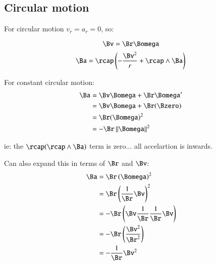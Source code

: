 \documentclass{article}
\newcommand{\Norm}[1]{\left\lVert{#1}\right\rVert}
\begin{document}
\subsection{Circular motion}

For circular motion $v_r = a_r = 0$, so:

\[
\Bv = \Br \Bomega
\]
\[
\Ba = \rcap \left(  -\frac{\Bv^2}{r} + \rcap \wedge \Ba \right) \\
\]

For constant circular motion:
\begin{align*}
\Ba 
   &= \Bv\Bomega + \Br\Bomega' \\
   &= \Bv\Bomega + \Br(\Bzero) \\
   &= \Br(\Bomega)^2 \\
   &= -\Br\Norm{\Bomega}^2 \\
\end{align*}

ie: the $\rcap (\rcap \wedge \Ba )$ term is zero... all accelartion is inwards.

Can also expand this in terms of $\Br$ and $\Bv$:
\begin{align*}
\Ba 
   &= \Br\left(\Bomega\right)^2 \\
   &= \Br\left(\frac{1}{\Br}\Bv\right)^2 \\
   &= -\Br\left( \Bv \frac{1}{\Br} \frac{1}{\Br}\Bv \right) \\
   &= -\Br\left( \frac{\Bv^2}{\Br^2}\right) \\
   &= -\frac{1}{\Br}\Bv^2 \\
\end{align*}



\end{document}

